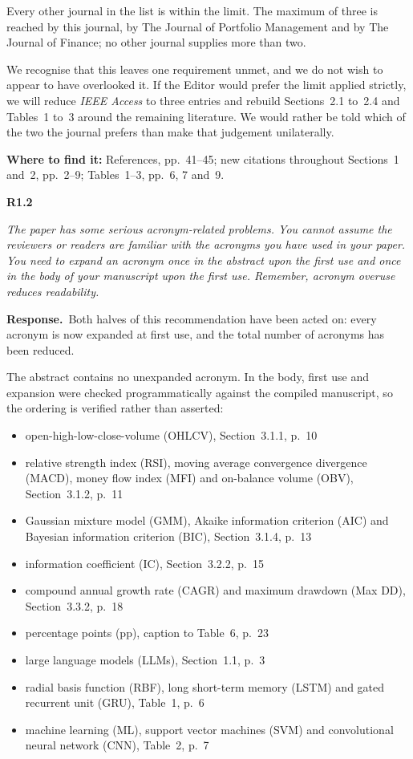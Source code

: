 \documentclass[11pt,a4paper]{article}
\newcommand{\rc}[2]{%
  \par\medskip\noindent
  \colorbox{qbg}{\parbox{\dimexpr\linewidth-2\fboxsep}{%
  \textbf{#1}\par\smallskip\itshape #2}}\par\nopagebreak}
\newcommand{\resp}{\par\medskip\noindent\textbf{Response.}\ }
\newcommand{\where}[1]{\par\smallskip\noindent\textcolor{blue!55!black}{\textbf{Where to find it:} #1}\par}
\begin{document}
Every other journal in the list is within the limit. The maximum of three is reached by
this journal, by The Journal of Portfolio Management and by The Journal of Finance; no
other journal supplies more than two.

We recognise that this leaves one requirement unmet, and we do not wish to appear to have
overlooked it. If the Editor would prefer the limit applied strictly, we will reduce
\emph{IEEE Access} to three entries and rebuild Sections~2.1 to~2.4 and Tables~1 to~3
around the remaining literature. We would rather be told which of the two the journal
prefers than make that judgement unilaterally.
\where{References, pp.~41--45; new citations throughout Sections~1 and~2, pp.~2--9;
Tables~1--3, pp.~6, 7 and~9.}

\rc{R1.2}{The paper has some serious acronym-related problems. You cannot assume the
reviewers or readers are familiar with the acronyms you have used in your paper. You need
to expand an acronym once in the abstract upon the first use and once in the body of your
manuscript upon the first use. Remember, acronym overuse reduces readability.}

\resp Both halves of this recommendation have been acted on: every acronym is now expanded
at first use, and the total number of acronyms has been reduced.

The abstract contains no unexpanded acronym. In the body, first use and expansion were
checked programmatically against the compiled manuscript, so the ordering is verified
rather than asserted:

\begin{itemize}
\item open-high-low-close-volume (OHLCV), Section~3.1.1, p.~10
\item relative strength index (RSI), moving average convergence divergence (MACD), money
flow index (MFI) and on-balance volume (OBV), Section~3.1.2, p.~11
\item Gaussian mixture model (GMM), Akaike information criterion (AIC) and Bayesian
information criterion (BIC), Section~3.1.4, p.~13
\item information coefficient (IC), Section~3.2.2, p.~15
\item compound annual growth rate (CAGR) and maximum drawdown (Max DD), Section~3.3.2,
p.~18
\item percentage points (pp), caption to Table~6, p.~23
\item large language models (LLMs), Section~1.1, p.~3
\item radial basis function (RBF), long short-term memory (LSTM) and gated recurrent unit
(GRU), Table~1, p.~6
\item machine learning (ML), support vector machines (SVM) and convolutional neural
network (CNN), Table~2, p.~7
\end{itemize}
\end{document}
